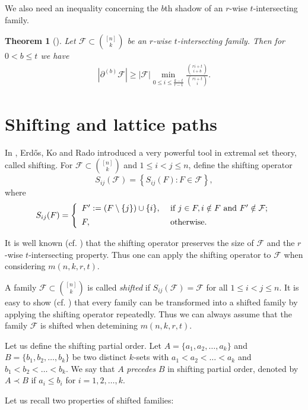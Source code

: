 \documentclass[11pt,a4paper]{article}
\newtheorem{thm}{Theorem}[section]
\newtheorem{false statement}{False statement}
\theoremstyle{definition}
\def\hf{\mathcal{F}}
\begin{document}
We also need an inequality concerning the $b$th shadow of an $r$-wise $t$-intersecting family. 

\begin{thm}[\cite{F91-2}]\label{thm-F91}
Let $\hf\subset \binom{[n]}{k}$ be an $r$-wise $t$-intersecting family. Then for $0<b\leq t$ we have
\begin{align}\label{ineq-key4}
|\partial^{(b)} \hf| \geq |\hf| \min_{0\leq i\leq \frac{k-t}{r-1}} \frac{\binom{ri+t}{i+b}}{\binom{ri+t}{i}}.
\end{align}
\end{thm}

\section{Shifting and lattice paths}


In \cite{ekr}, Erd\H{o}s, Ko and Rado introduced a very powerful tool in extremal set theory, called shifting.
For $\hf\subset \binom{[n]}{k}$ and $1\leq i<j\leq n$, define the shifting operator
$$S_{ij}(\hf)=\left\{S_{ij}(F)\colon F\in\hf\right\},$$
where
$$S_{ij}(F)=\left\{
                \begin{array}{ll}
                 F':= (F\setminus\{j\})\cup\{i\}, & \mbox{ if } j\in F, i\notin F \text{ and } F'\notin \hf; \\[5pt]
                  F, & \hbox{ otherwise.}
                \end{array}
              \right.
$$

It is well known (cf. \cite{F87}) that the shifting operator preserves the size of $\hf$ and the $r$-wise $t$-intersecting property. Thus one can apply the shifting operator to  $\hf$ when considering $m(n,k,r,t)$.

A family $\hf\subset \binom{[n]}{k}$ is called {\it shifted} if $S_{ij}(\hf)=\hf$ for all $1\leq i<j\leq n$. It is easy to show (cf. \cite{F87}) that every family can be transformed into a shifted family by applying the shifting operator repeatedly. Thus we can always assume that the family $\hf$ is shifted when detemining $m(n,k,r,t)$.

Let us define the shifting partial order.
Let $A=\{a_1,a_2,\ldots,a_k\}$ and $B=\{b_1,b_2,\ldots,b_k\}$ be two distinct $k$-sets with $a_1<a_2<\ldots<a_k$ and $b_1<b_2<\ldots<b_k$. We say that $A$ {\it precedes} $B$ in shifting partial order, denoted by $A\prec B$ if $a_i\leq b_i$ for $i=1,2,\ldots,k$.

Let us recall two properties of shifted families:
\end{document}
